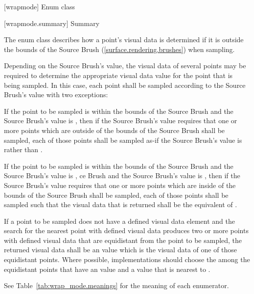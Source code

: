  [wrapmode] {Enum class }

 [wrapmode.summary] { Summary}

\pnum
The  enum class describes how a point's visual data is 
determined if it is outside the bounds of the Source Brush (\ref{surface.rendering.brushes}) when sampling.

\pnum
Depending on the Source Brush's  value, the visual data of several points may be required to determine the appropriate visual data value for the point that is being sampled. In this case, each point shall be sampled according to the Source Brush's  value with two exceptions:
\begin{enumeratea}
\item If the point to be sampled is within the bounds of the Source Brush and the Source Brush's  value is , then if the Source Brush's  value requires that one or more points which are outside of the bounds of the Source Brush shall be sampled, each of those points shall be sampled as-if the Source Brush's  value is  rather than .
\item If the point to be sampled is within the bounds of the Source Brush and the Source Brush's  value is , ce Brush and the Source Brush's  value is , then if the Source Brush's  value requires that one or more points which are inside of the bounds of the Source Brush shall be sampled, each of those points shall be sampled such that the visual data that is returned shall be the equivalent of .
\end{enumeratea}

\pnum
If a point to be sampled does not have a defined visual data element and the search for the nearest point with defined visual data produces two or more points with defined visual data that are equidistant from the point to be sampled, the returned visual data shall be an \unspecnorm value which is the visual data of one of those equidistant points. Where possible, implementations should choose the among the equidistant points that have an \xaxis value and a \yaxis value that is nearest to .

\pnum
See Table~\ref{tab:wrap_mode.meanings} for the meaning of each  enumerator.

